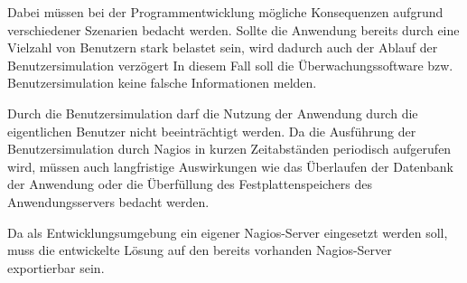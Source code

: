 Dabei müssen bei der Programmentwicklung mögliche Konsequenzen aufgrund verschiedener Szenarien bedacht werden.
Sollte die Anwendung bereits durch eine Vielzahl von Benutzern stark belastet sein, wird dadurch auch der Ablauf der Benutzersimulation verzögert
In diesem Fall soll die Überwachungssoftware bzw. Benutzersimulation keine falsche Informationen melden.

Durch die Benutzersimulation darf die Nutzung der Anwendung durch die eigentlichen Benutzer nicht beeinträchtigt werden.
Da die Ausführung der Benutzersimulation durch Nagios in kurzen Zeitabständen periodisch aufgerufen wird, müssen auch langfristige Auswirkungen wie das Überlaufen der Datenbank der Anwendung oder die Überfüllung des Festplattenspeichers des Anwendungsservers bedacht werden.

Da als Entwicklungsumgebung ein eigener Nagios-Server eingesetzt werden soll, muss die entwickelte Lösung auf den bereits vorhanden Nagios-Server exportierbar sein.


